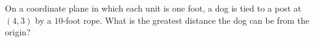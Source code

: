 On a coordinate plane in which each unit is one foot, a dog is tied to a post at $(4,3)$ by a $10$-foot rope. What is the greatest distance the dog can be from the origin?
